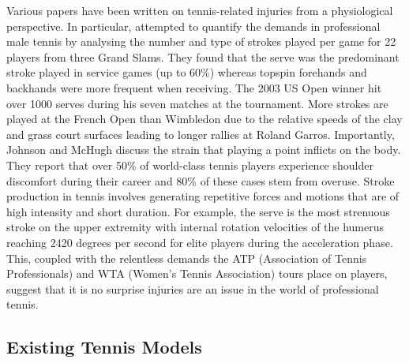 \documentclass[letterpaper,12pt]{article}
\begin{document}
Various papers have been written on tennis-related injuries from a physiological perspective.  In particular, \cite{demands} attempted to quantify the demands in professional male tennis by analysing the number and type of strokes played per game for 22 players from three Grand Slams.  They found that the serve was the predominant stroke played in service games (up to 60\%) whereas topspin forehands and backhands were more frequent when receiving.  The 2003 US Open winner hit over 1000 serves during his seven matches at the tournament.  More strokes are played at the French Open than Wimbledon due to the relative speeds of the clay and grass court surfaces leading to longer rallies at Roland Garros.  Importantly, Johnson and McHugh discuss the strain that playing a point inflicts on the body.  They report that over 50\% of world-class tennis players experience shoulder discomfort during their career and 80\% of these cases stem from overuse.  Stroke production in tennis involves generating repetitive forces and motions that are of high intensity and short duration.  For example, the serve is the most strenuous stroke on the upper extremity with internal rotation velocities of the humerus reaching 2420 degrees per second for elite players during the acceleration phase.  This, coupled with the relentless demands the ATP (Association of Tennis Professionals) and WTA (Women's Tennis Association) tours place on players, suggest that it is no surprise injuries are an issue in the world of professional tennis.

\subsection{Existing Tennis Models}
\end{document}
